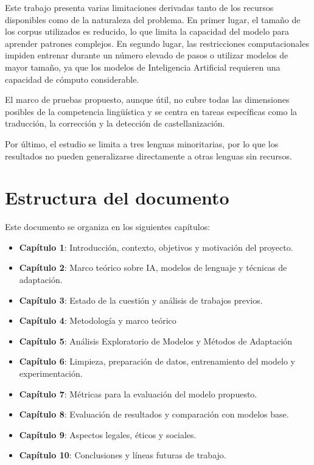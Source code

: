 Este trabajo presenta varias limitaciones derivadas tanto de los recursos disponibles como de la naturaleza del problema. En primer lugar, el tamaño de los corpus utilizados es reducido, lo que limita la capacidad del modelo para aprender patrones complejos. En segundo lugar, las restricciones computacionales impiden entrenar durante un número elevado de pasos o utilizar modelos de mayor tamaño, ya que los modelos de Inteligencia Artificial requieren una capacidad de cómputo considerable.

El marco de pruebas propuesto, aunque útil, no cubre todas las dimensiones posibles de la competencia lingüística y se centra en tareas específicas como la traducción, la corrección y la detección de castellanización.

Por último, el estudio se limita a tres lenguas minoritarias, por lo que los resultados no pueden generalizarse directamente a otras lenguas sin recursos.


\section{Estructura del documento}
Este documento se organiza en los siguientes capítulos:

\begin{itemize}
    \item \textbf{Capítulo 1}: Introducción, contexto, objetivos y motivación del proyecto.
    \item \textbf{Capítulo 2}: Marco teórico sobre IA, modelos de lenguaje y técnicas de adaptación.
    \item \textbf{Capítulo 3}: Estado de la cuestión y análisis de trabajos previos.
    \item \textbf{Capítulo 4}: Metodología y marco teórico
    \item \textbf{Capítulo 5}: Análisis Exploratorio de Modelos y Métodos de Adaptación
    \item \textbf{Capítulo 6}: Limpieza, preparación de datos, entrenamiento del modelo y experimentación.
    \item \textbf{Capítulo 7}: Métricas para la evaluación del modelo propuesto.
    \item \textbf{Capítulo 8}: Evaluación de resultados y comparación con modelos base.
    \item \textbf{Capítulo 9}: Aspectos legales, éticos y sociales.
    \item \textbf{Capítulo 10}: Conclusiones y líneas futuras de trabajo.
\end{itemize}
